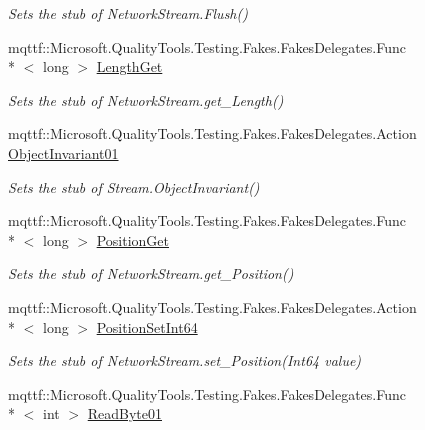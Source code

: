 \begin{DoxyCompactItemize}
\begin{DoxyCompactList}\small\item\em Sets the stub of Network\-Stream.\-Flush()\end{DoxyCompactList}\item 
mqttf\-::\-Microsoft.\-Quality\-Tools.\-Testing.\-Fakes.\-Fakes\-Delegates.\-Func\\*
$<$ long $>$ \hyperlink{class_system_1_1_net_1_1_sockets_1_1_fakes_1_1_stub_network_stream_a579d38292c72f5aa375b0a4533665ceb}{Length\-Get}
\begin{DoxyCompactList}\small\item\em Sets the stub of Network\-Stream.\-get\-\_\-\-Length()\end{DoxyCompactList}\item 
mqttf\-::\-Microsoft.\-Quality\-Tools.\-Testing.\-Fakes.\-Fakes\-Delegates.\-Action \hyperlink{class_system_1_1_net_1_1_sockets_1_1_fakes_1_1_stub_network_stream_a1459740bc71b7c7cf1ee1908451c5c69}{Object\-Invariant01}
\begin{DoxyCompactList}\small\item\em Sets the stub of Stream.\-Object\-Invariant()\end{DoxyCompactList}\item 
mqttf\-::\-Microsoft.\-Quality\-Tools.\-Testing.\-Fakes.\-Fakes\-Delegates.\-Func\\*
$<$ long $>$ \hyperlink{class_system_1_1_net_1_1_sockets_1_1_fakes_1_1_stub_network_stream_aa1dbb93f0965a1b0be4ef00559885deb}{Position\-Get}
\begin{DoxyCompactList}\small\item\em Sets the stub of Network\-Stream.\-get\-\_\-\-Position()\end{DoxyCompactList}\item 
mqttf\-::\-Microsoft.\-Quality\-Tools.\-Testing.\-Fakes.\-Fakes\-Delegates.\-Action\\*
$<$ long $>$ \hyperlink{class_system_1_1_net_1_1_sockets_1_1_fakes_1_1_stub_network_stream_affd54cb1dc9f1eeb9cc3bcd3954b3cbf}{Position\-Set\-Int64}
\begin{DoxyCompactList}\small\item\em Sets the stub of Network\-Stream.\-set\-\_\-\-Position(\-Int64 value)\end{DoxyCompactList}\item 
mqttf\-::\-Microsoft.\-Quality\-Tools.\-Testing.\-Fakes.\-Fakes\-Delegates.\-Func\\*
$<$ int $>$ \hyperlink{class_system_1_1_net_1_1_sockets_1_1_fakes_1_1_stub_network_stream_a2fffdd58c94d592950b8c75e705de988}{Read\-Byte01}

\end{DoxyCompactItemize}
